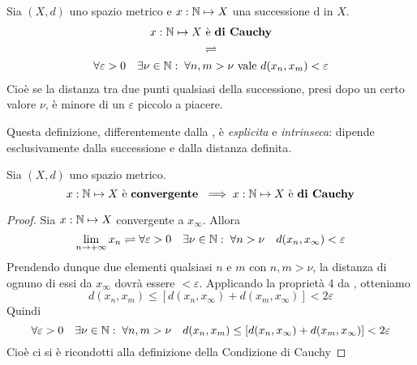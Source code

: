\begin{definition}
	Sia $(X,d)$ uno spazio metrico e $x: \mathbb{N} \mapsto X$ una successione d in $X$.
	\begin{equation}
		\begin{gathered}
			x:\mathbb{N} \mapsto X \text{ è \textbf{di Cauchy}}\\
			\rightleftharpoons\\
			\forall \varepsilon > 0\quad \exists \nu \in \mathbb{N}:\; \forall n,m > \nu \text{ vale } d(x_n, x_m) < \varepsilon
		\end{gathered}
	\end{equation}
	Cioè se la distanza tra due punti qualsiasi della successione, presi dopo un certo valore $\nu$, è minore di un $\varepsilon$ piccolo a piacere.
	\begin{note}
		Questa definizione, differentemente dalla , è \textit{esplicita} e \textit{intrinseca}: dipende esclusivamente dalla successione e dalla distanza definita.
	\end{note}
\end{definition}
\begin{proposition}
	\label{prop:se_succ_conv_allora_cau}
	Sia $(X,d)$ uno spazio metrico.
	$$x: \mathbb{N} \mapsto X \text{ è \textbf{convergente} } \implies x:\mathbb{N} \mapsto X \text{ è \textbf{di Cauchy}}$$
	\begin{proof}
		Sia $x: \mathbb{N} \mapsto X$ convergente a $x_\infty$. Allora
		$$\lim\limits_{n \to +\infty} x_n \rightleftharpoons \forall\varepsilon > 0 \quad \exists\nu\in\mathbb{N}:\; \forall n > \nu \quad d(x_n,x_\infty)<\varepsilon$$
		Prendendo dunque due elementi qualsiasi $n$ e $m$ con $n,m > \nu$, la distanza di ognuno di essi da $x_\infty$ dovrà essere $<\varepsilon$. Applicando la proprietà 4 da , otteniamo
		$$d(x_n,x_m) \leq \left[ d(x_n,x_\infty)+d(x_m,x_\infty) \right] < 2\varepsilon$$
		Quindi
		$$\forall\varepsilon > 0 \quad \exists\nu\in\mathbb{N}:\; \forall n,m > \nu \quad d(x_n,x_m) \leq \left[ d(x_n,x_\infty)+d(x_m,x_\infty) \right] < 2\varepsilon$$
		Cioè ci si è ricondotti alla definizione della Condizione di Cauchy
	\end{proof}
\end{proposition}

